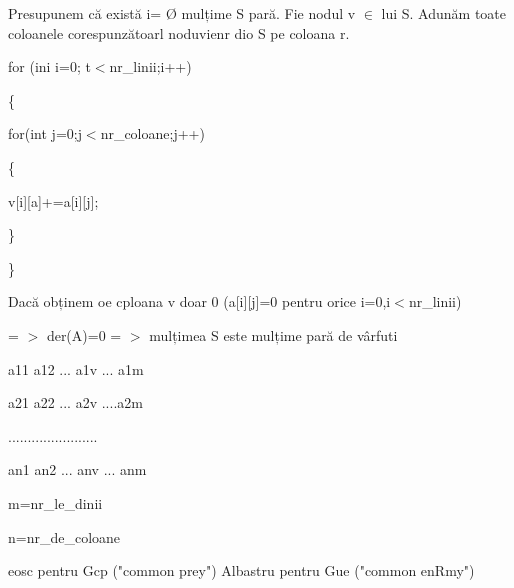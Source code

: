 \documentclass[12pt]{article}
\begin{document}
{\raggedright
Presupunem c\u{a} exist\u{a} i= \O{} mulțime S par\u{a}. Fie nodul v $\in{}$ lui
S. Adun\u{a}m toate coloanele corespunz\u{a}toarl noduvienr dio S pe coloana r.
}

{\raggedright
for (ini i=0; t$<$nr\_linii;i++)
}

{\raggedright
\{
}

{\raggedright
\hspace{15pt}for(int j=0;j$<$nr\_coloane;j++)
}

{\raggedright
\{
}

{\raggedright
\hspace{15pt}v[i][a]+=a[i][j];
}

{\raggedright
\}
}

{\raggedright
\}
}

{\raggedright
Dac\u{a} obținem oe cploana v doar 0 (a[i][j]=0 pentru orice i=0,i$<$nr\_linii)
}

{\raggedright
= $>$ der(A)=0 = $>$ mulțimea S este mulțime par\u{a} de v\^{a}rfuti
}

{\raggedright
a11 a12 ... a1v ... a1m
}

{\raggedright
a21 a22 ... a2v ....a2m
}

{\raggedright
.......................
}

{\raggedright
an1 an2 ... anv ... anm
}

{\raggedright
m=nr\_le\_dinii
}

{\raggedright
n=nr\_de\_coloane
}

{\raggedright
{\scriptsize eosc pentru Gcp ("common prey") Albastru pentru Gue ("common
enRmy")}
}
\end{document}
